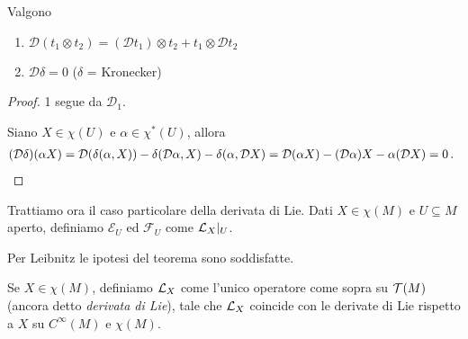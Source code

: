 \begin{corollary}
	Valgono
	\begin{enumerate}
		\item $\mathcal D(t_1\otimes t_2) = (\mathcal D t_1) \otimes t_2 + t_1\otimes \mathcal D t_2$
		\item $\mathcal D\delta = 0$ ($\delta$ = Kronecker)
	\end{enumerate}
\end{corollary}
\begin{proof}
	1 segue da $\mathcal D_1$.
	
	Siano $X\in\chi(U)$ e $\alpha\in\chi^*(U)$, allora 
	\begin{align*}
	(\mathcal D\delta)(\alpha X) = \mathcal D(\delta(\alpha,X)) - \delta(\mathcal D\alpha,X) - \delta(\alpha,\mathcal D X) = \mathcal D (\alpha X) - (\mathcal D\alpha)X - \alpha(\mathcal DX) = 0\punto %
	\end{align*}
\end{proof}

Trattiamo ora il caso particolare della derivata di Lie.
Dati $X\in\chi(M)$ e $U\subseteq M$ aperto, definiamo $\mathcal E_U$ ed $\mathcal F_U$ come $\mathcal L_X|_ U$.

Per Leibnitz le ipotesi del teorema sono soddisfatte.

\begin{definition}
	Se $X\in\chi(M)$, definiamo $\mathcal L_X$ come l'unico operatore come sopra su $\mathcal T(M)$ (ancora detto \emph{derivata di Lie}), tale che $\mathcal L_X$ coincide con le derivate di Lie rispetto a $X$ su $C^\infty(M)$ e $\chi(M)$.
\end{definition}

